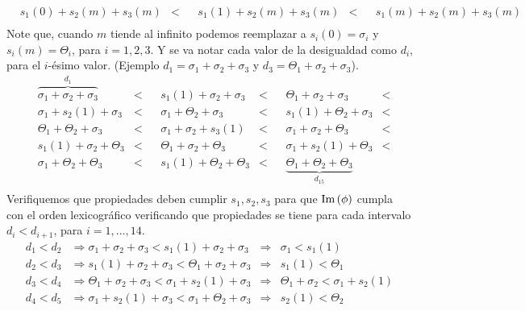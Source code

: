\documentclass{article}
\begin{document}
\begin{itemize}
\[\begin{aligned}
                &s_1(0) + s_2(m) + s_3(m)& <& &s_1(1) + s_2(m) + s_3(m)& <& &s_1(m) + s_2(m) + s_3(m)& \\
            \end{aligned}
        \]
        Note que, cuando \(m\) tiende al infinito podemos reemplazar a \(s_i(0) = \sigma_i\) y \(s_i(m) = \Theta_i\), para \(i = 1, 2, 3\). 
        Y se va notar cada valor de la desigualdad como \(d_i\), para el \(i\)-ésimo valor. 
        (Ejemplo \(d_1 = \sigma_1 + \sigma_2 + \sigma_3\) y \(d_3 = \Theta_1 + \sigma_2 + \sigma_3\)). 
        \[
            \begin{aligned}
                &\overbrace{\sigma_1 + \sigma_2 + \sigma_3}^{d_1}& <& &s_1(1) + \sigma_2 + \sigma_3& <& &\Theta_1 + \sigma_2 + \sigma_3& <\\
                &\sigma_1 + s_2(1) + \sigma_3& <& &\sigma_1 + \Theta_2 + \sigma_3& <& &s_1(1) + \Theta_2 + \sigma_3& <\\
                &\Theta_1 + \Theta_2 + \sigma_3& <& &\sigma_1 + \sigma_2 + s_3(1)& <& &\sigma_1 + \sigma_2 + \Theta_3& <\\
                &s_1(1) + \sigma_2 + \Theta_3& <& &\Theta_1 + \sigma_2 + \Theta_3& <& &\sigma_1 + s_2(1) + \Theta_3& <\\
                &\sigma_1 + \Theta_2 + \Theta_3& <& &s_1(1) + \Theta_2 + \Theta_3& <& &\underbrace{\Theta_1 + \Theta_2 + \Theta_3}_{d_{15}}& \\
            \end{aligned}
        \]
        Verifiquemos que propiedades deben cumplir \(s_1, s_2, s_3\) para que \(\text{Im}\left( \phi \right)\) cumpla con el orden lexicográfico verificando que propiedades 
        se tiene para cada intervalo \(d_i < d_{i + 1}\), para \(i = 1, \ldots, 14\).
        \begin{align}
            d_1 < d_2       &\Rightarrow \sigma_1 + \sigma_2 + \sigma_3 < s_1(1) + \sigma_2 + \sigma_3     &\Rightarrow& \sigma_1 < s_1(1)                            \tag{1}\label{eq-1} \\
            d_2 < d_3       &\Rightarrow s_1(1) + \sigma_2 + \sigma_3   < \Theta_1 + \sigma_2 + \sigma_3   &\Rightarrow& s_1(1) < \Theta_1                            \tag{2}\label{eq-2} \\
            d_3 < d_4       &\Rightarrow \Theta_1 + \sigma_2 + \sigma_3 < \sigma_1 + s_2(1) + \sigma_3     &\Rightarrow& \Theta_1 + \sigma_2 < \sigma_1 + s_2(1)      \tag{3}\label{eq-3} \\
            d_4 < d_5       &\Rightarrow \sigma_1 + s_2(1) + \sigma_3   < \sigma_1 + \Theta_2 + \sigma_3   &\Rightarrow& s_2(1) < \Theta_2                            \tag{4}\label{eq-4}\\

\end{align}
\end{itemize}
\end{document}
